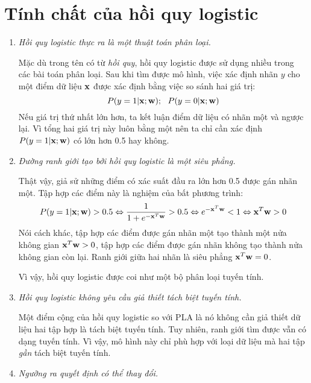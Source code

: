 \section{Tính chất của hồi quy logistic}
\begin{enumerate}
\item \textit{Hồi quy logistic thực ra là một thuật toán phân loại.}

Mặc dù trong tên có từ \textit{hồi quy}, hồi quy logistic được sử dụng nhiều
trong các bài toán phân loại. Sau khi tìm được mô hình, việc xác định
nhãn $y$ cho một điểm dữ liệu $\mathbf{x}$ được xác định bằng việc so sánh
hai giá trị:
\begin{equation}
P(y = 1| \mathbf{x}; \mathbf{w}); ~~ P(y = 0| \mathbf{x}; \mathbf{w})
\end{equation}
Nếu giá trị thứ nhất lớn hơn, ta kết luận điểm dữ liệu có nhãn một và
ngược lại. Vì tổng hai giá trị này luôn bằng một nên ta chỉ cần xác định
$P(y = 1| \mathbf{x}; \mathbf{w})$ có lớn hơn 0.5 hay không.



\item \textit{Đường ranh giới tạo bởi hồi quy logistic là một siêu phẳng.}

Thật vậy, giả sử những điểm có xác suất đầu ra lớn hơn 0.5 được gán nhãn một. Tập hợp các điểm này là nghiệm của bất phương trình:
\begin{eqnarray*}
P(y = 1| \mathbf{x}; \mathbf{w}) > 0.5
\Leftrightarrow \frac{1}{1 + e^{-\mathbf{x}^T\mathbf{w}}} > 0.5
\Leftrightarrow e^{-\mathbf{x}^T\mathbf{w}} < 1
\Leftrightarrow \mathbf{x}^T\mathbf{w} > 0
\end{eqnarray*}
Nói cách khác, tập hợp các điểm được gán nhãn một tạo thành một nửa không gian $\mathbf{x}^T\mathbf{w} > 0$, tập hợp các điểm được gán nhãn không tạo thành nửa không gian còn lại. Ranh giới giữa hai nhãn là siêu phẳng $\mathbf{x}^T\mathbf{w} = 0$.

Vì vậy, hồi quy logistic được coi như một bộ phân loại tuyến tính.

\item \textit{Hồi quy logistic không yêu cầu giả thiết tách biệt tuyến tính.}

Một điểm cộng của hồi quy logistic so với PLA là nó không cần giả thiết dữ liệu hai tập hợp là tách biệt tuyến tính. Tuy nhiên, ranh giới tìm được vẫn có dạng tuyến tính. Vì vậy, mô hình này chỉ phù hợp với loại dữ liệu mà hai tập \textit{gần} tách biệt tuyến tính.

\item \textit{Ngưỡng ra quyết định có thể thay đổi.}


\end{enumerate}
